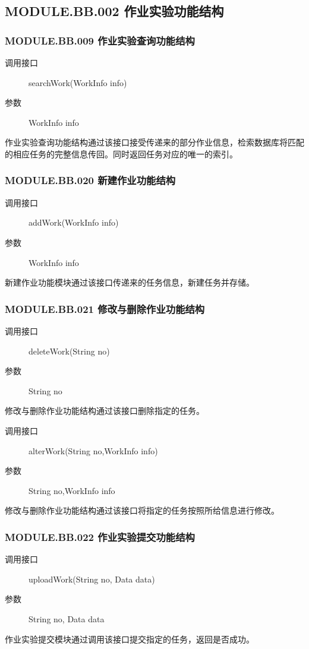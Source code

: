 \subsection{MODULE.BB.002 作业实验功能结构}
  \subsubsection{MODULE.BB.009 作业实验查询功能结构}
  \begin{description}
    \item[调用接口]searchWork(WorkInfo info)
    \item[参数]WorkInfo info
  \end{description}
  作业实验查询功能结构通过该接口接受传递来的部分作业信息，检索数据库将匹配的相应任务的完整信息传回。同时返回任务对应的唯一的索引。
  \subsubsection{MODULE.BB.020 新建作业功能结构}
  \begin{description}
    \item[调用接口]addWork(WorkInfo info)
    \item[参数]WorkInfo info
  \end{description}
  新建作业功能模块通过该接口传递来的任务信息，新建任务并存储。
  \subsubsection{MODULE.BB.021 修改与删除作业功能结构}
  \begin{description}
    \item[调用接口]deleteWork(String no)
    \item[参数]String no
  \end{description}
  修改与删除作业功能结构通过该接口删除指定的任务。
  \begin{description}
    \item[调用接口]alterWork(String no,WorkInfo info)
    \item[参数]String no,WorkInfo info
  \end{description}
  修改与删除作业功能结构通过该接口将指定的任务按照所给信息进行修改。
  \subsubsection{MODULE.BB.022 作业实验提交功能结构}
  \begin{description}
    \item[调用接口]uploadWork(String no, Data data)
    \item[参数]String no, Data data
  \end{description}
  作业实验提交模块通过调用该接口提交指定的任务，返回是否成功。

